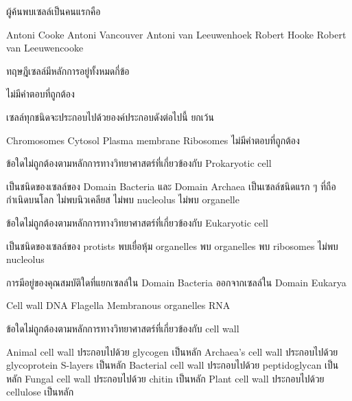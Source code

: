 \documentclass[12pt, a4paper]{exam}
\begin{document}
\begin{questions}
\filbreak
  \question ผู้ค้นพบเซลล์เป็นคนแรกคือ
  \begin{choices}
    \choice Antoni Cooke
    \choice Antoni Vancouver
    \choice Antoni van Leeuwenhoek
    \choice Robert Hooke
    \choice Robert van Leeuwencooke
\end{choices}

\filbreak
  \question ทฤษฎีเซลล์มีหลักการอยู่ทั้งหมดกี่ข้อ
  \begin{choices}
    \choice ไม่มีคำตอบที่ถูกต้อง
\end{choices}

\filbreak
  \question เซลล์ทุกชนิดจะประกอบไปด้วยองค์ประกอบดังต่อไปนี้ ยกเว้น
  \begin{choices}
    \choice Chromosomes
    \choice Cytosol
    \choice Plasma membrane
    \choice Ribosomes
    \choice ไม่มีคำตอบที่ถูกต้อง
\end{choices}

\filbreak
  \question ข้อใดไม่ถูกต้องตามหลักการทางวิทยาศาสตร์ที่เกี่ยวข้องกับ Prokaryotic cell
  \begin{choices}
    \choice เป็นชนิดของเซลล์ของ Domain Bacteria และ Domain Archaea
    \choice เป็นเซลล์ชนิดแรก ๆ ที่ถือกำเนิดบนโลก
    \choice ไม่พบนิวเคลียส
    \choice ไม่พบ nucleolus
    \choice ไม่พบ organelle
\end{choices}

\filbreak
  \question ข้อใดไม่ถูกต้องตามหลักการทางวิทยาศาสตร์ที่เกี่ยวข้องกับ Eukaryotic cell
  \begin{choices}
    \choice เป็นชนิดของเซลล์ของ protists
    \choice พบเยื่อหุ้ม organelles
    \choice พบ organelles
    \choice พบ ribosomes
    \choice ไม่พบ nucleolus
\end{choices}

\filbreak
  \question การมีอยู่ของคุณสมบัติใดที่แยกเซลล์ใน Domain Bacteria ออกจากเซลล์ใน Domain Eukarya
  \begin{choices}
    \choice Cell wall
    \choice DNA
    \choice Flagella
    \choice Membranous organelles
    \choice RNA
\end{choices}

\filbreak
  \question ข้อใดไม่ถูกต้องตามหลักการทางวิทยาศาสตร์ที่เกี่ยวข้องกับ cell wall
  \begin{choices}
    \choice Animal cell wall ประกอบไปด้วย glycogen เป็นหลัก
    \choice Archaea's cell wall ประกอบไปด้วย glycoprotein S-layers เป็นหลัก
    \choice Bacterial cell wall ประกอบไปด้วย peptidoglycan เป็นหลัก
    \choice Fungal cell wall ประกอบไปด้วย chitin เป็นหลัก
    \choice Plant cell wall ประกอบไปด้วย cellulose เป็นหลัก
\end{choices}


\end{questions}
\end{document}
